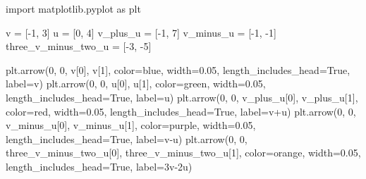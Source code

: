 \documentclass[
  letterpaper,
  DIV=11,
  numbers=noendperiod]{scrartcl}
\newenvironment{Shaded}{\begin{snugshade}}{\end{snugshade}}
\newcommand{\DecValTok}[1]{\textcolor[rgb]{0.68,0.00,0.00}{#1}}
\newcommand{\FloatTok}[1]{\textcolor[rgb]{0.68,0.00,0.00}{#1}}
\newcommand{\ImportTok}[1]{\textcolor[rgb]{0.00,0.46,0.62}{#1}}
\newcommand{\NormalTok}[1]{\textcolor[rgb]{0.00,0.23,0.31}{#1}}
\newcommand{\OperatorTok}[1]{\textcolor[rgb]{0.37,0.37,0.37}{#1}}
\newcommand{\StringTok}[1]{\textcolor[rgb]{0.13,0.47,0.30}{#1}}
\newcommand{\VariableTok}[1]{\textcolor[rgb]{0.07,0.07,0.07}{#1}}
\begin{document}
\begin{Shaded}
\begin{Highlighting}[numbers=left,,]
\ImportTok{import}\NormalTok{ matplotlib.pyplot }\ImportTok{as}\NormalTok{ plt}

\NormalTok{v }\OperatorTok{=}\NormalTok{ [}\OperatorTok{{-}}\DecValTok{1}\NormalTok{, }\DecValTok{3}\NormalTok{]}
\NormalTok{u }\OperatorTok{=}\NormalTok{ [}\DecValTok{0}\NormalTok{, }\DecValTok{4}\NormalTok{]}
\NormalTok{v\_plus\_u }\OperatorTok{=}\NormalTok{ [}\OperatorTok{{-}}\DecValTok{1}\NormalTok{, }\DecValTok{7}\NormalTok{]}
\NormalTok{v\_minus\_u }\OperatorTok{=}\NormalTok{ [}\OperatorTok{{-}}\DecValTok{1}\NormalTok{, }\OperatorTok{{-}}\DecValTok{1}\NormalTok{]}
\NormalTok{three\_v\_minus\_two\_u }\OperatorTok{=}\NormalTok{ [}\OperatorTok{{-}}\DecValTok{3}\NormalTok{, }\OperatorTok{{-}}\DecValTok{5}\NormalTok{]}

\NormalTok{plt.arrow(}\DecValTok{0}\NormalTok{, }\DecValTok{0}\NormalTok{, v[}\DecValTok{0}\NormalTok{], v[}\DecValTok{1}\NormalTok{], color}\OperatorTok{=}\StringTok{\textquotesingle{}blue\textquotesingle{}}\NormalTok{, width}\OperatorTok{=}\FloatTok{0.05}\NormalTok{, length\_includes\_head}\OperatorTok{=}\VariableTok{True}\NormalTok{, label}\OperatorTok{=}\StringTok{\textquotesingle{}v\textquotesingle{}}\NormalTok{)}
\NormalTok{plt.arrow(}\DecValTok{0}\NormalTok{, }\DecValTok{0}\NormalTok{, u[}\DecValTok{0}\NormalTok{], u[}\DecValTok{1}\NormalTok{], color}\OperatorTok{=}\StringTok{\textquotesingle{}green\textquotesingle{}}\NormalTok{, width}\OperatorTok{=}\FloatTok{0.05}\NormalTok{, length\_includes\_head}\OperatorTok{=}\VariableTok{True}\NormalTok{, label}\OperatorTok{=}\StringTok{\textquotesingle{}u\textquotesingle{}}\NormalTok{)}
\NormalTok{plt.arrow(}\DecValTok{0}\NormalTok{, }\DecValTok{0}\NormalTok{, v\_plus\_u[}\DecValTok{0}\NormalTok{], v\_plus\_u[}\DecValTok{1}\NormalTok{], color}\OperatorTok{=}\StringTok{\textquotesingle{}red\textquotesingle{}}\NormalTok{, width}\OperatorTok{=}\FloatTok{0.05}\NormalTok{, length\_includes\_head}\OperatorTok{=}\VariableTok{True}\NormalTok{, label}\OperatorTok{=}\StringTok{\textquotesingle{}v+u\textquotesingle{}}\NormalTok{)}
\NormalTok{plt.arrow(}\DecValTok{0}\NormalTok{, }\DecValTok{0}\NormalTok{, v\_minus\_u[}\DecValTok{0}\NormalTok{], v\_minus\_u[}\DecValTok{1}\NormalTok{], color}\OperatorTok{=}\StringTok{\textquotesingle{}purple\textquotesingle{}}\NormalTok{, width}\OperatorTok{=}\FloatTok{0.05}\NormalTok{, length\_includes\_head}\OperatorTok{=}\VariableTok{True}\NormalTok{, label}\OperatorTok{=}\StringTok{\textquotesingle{}v{-}u\textquotesingle{}}\NormalTok{)}
\NormalTok{plt.arrow(}\DecValTok{0}\NormalTok{, }\DecValTok{0}\NormalTok{, three\_v\_minus\_two\_u[}\DecValTok{0}\NormalTok{], three\_v\_minus\_two\_u[}\DecValTok{1}\NormalTok{], color}\OperatorTok{=}\StringTok{\textquotesingle{}orange\textquotesingle{}}\NormalTok{, width}\OperatorTok{=}\FloatTok{0.05}\NormalTok{, length\_includes\_head}\OperatorTok{=}\VariableTok{True}\NormalTok{, label}\OperatorTok{=}\StringTok{\textquotesingle{}3v{-}2u\textquotesingle{}}\NormalTok{)}


\end{Highlighting}
\end{Shaded}
\end{document}
